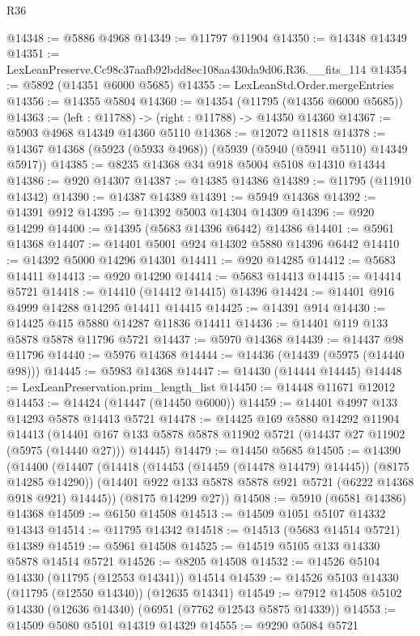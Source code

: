 \begin{lexlean}{R36}
\begin{coremodule}
@14348 := @5886 @4968
@14349 := @11797 @11904
@14350 := @14348 @14349
@14351 := LexLeanPreserve.Cc98c37aafb92bdd8ec108aa430da9d06.R36.__fits_114
@14354 := @5892 (@14351 @6000 @5685)
@14355 := LexLeanStd.Order.mergeEntries
@14356 := @14355 @5804
@14360 := @14354 (@11795 (@14356 @6000 @5685))
@14363 := (left : @11788) -> (right : @11788) -> @14350 @14360
@14367 := @5903 @4968 @14349 @14360 @5110
@14368 := @12072 @11818
@14378 := @14367 @14368 (@5923 (@5933 @4968)) (@5939 (@5940 (@5941 @5110) @14349 @5917))
@14385 := @8235 @14368 @34 @918 @5004 @5108 @14310 @14344
@14386 := @920 @14307
@14387 := @14385 @14386
@14389 := @11795 (@11910 @14342)
@14390 := @14387 @14389
@14391 := @5949 @14368
@14392 := @14391 @912
@14395 := @14392 @5003 @14304 @14309
@14396 := @920 @14299
@14400 := @14395 (@5683 @14396 @6442) @14386
@14401 := @5961 @14368
@14407 := @14401 @5001 @924 @14302 @5880 @14396 @6442
@14410 := @14392 @5000 @14296 @14301
@14411 := @920 @14285
@14412 := @5683 @14411
@14413 := @920 @14290
@14414 := @5683 @14413
@14415 := @14414 @5721
@14418 := @14410 (@14412 @14415) @14396
@14424 := @14401 @916 @4999 @14288 @14295 @14411 @14415
@14425 := @14391 @914
@14430 := @14425 @415 @5880 @14287 @11836 @14411
@14436 := @14401 @119 @133 @5878 @5878 @11796 @5721
@14437 := @5970 @14368
@14439 := @14437 @98 @11796
@14440 := @5976 @14368
@14444 := @14436 (@14439 (@5975 (@14440 @98)))
@14445 := @5983 @14368
@14447 := @14430 (@14444 @14445)
@14448 := LexLeanPreservation.prim_length_list
@14450 := @14448 @11671 @12012
@14453 := @14424 (@14447 (@14450 @6000))
@14459 := @14401 @4997 @133 @14293 @5878 @14413 @5721
@14478 := @14425
    @169
    @5880
    @14292
    @11904
    @14413
    (@14401 @167 @133 @5878 @5878 @11902 @5721 (@14437 @27 @11902 (@5975 (@14440 @27))) @14445)
@14479 := @14450 @5685
@14505 := @14390
    (@14400
      (@14407
        (@14418 (@14453 (@14459 (@14478 @14479) @14445)) (@8175 @14285 @14290))
        (@14401 @922 @133 @5878 @5878 @921 @5721 (@6222 @14368 @918 @921) @14445))
      (@8175 @14299 @27))
@14508 := @5910 (@6581 @14386) @14368
@14509 := @6150 @14508
@14513 := @14509 @1051 @5107 @14332 @14343
@14514 := @11795 @14342
@14518 := @14513 (@5683 @14514 @5721) @14389
@14519 := @5961 @14508
@14525 := @14519 @5105 @133 @14330 @5878 @14514 @5721
@14526 := @8205 @14508
@14532 := @14526 @5104 @14330 (@11795 (@12553 @14341)) @14514
@14539 := @14526 @5103 @14330 (@11795 (@12550 @14340)) (@12635 @14341)
@14549 := @7912 @14508 @5102 @14330 (@12636 @14340) (@6951 (@7762 @12543 @5875 @14339))
@14553 := @14509 @5080 @5101 @14319 @14329
@14555 := @9290 @5084 @5721

\end{coremodule}
\end{lexlean}
